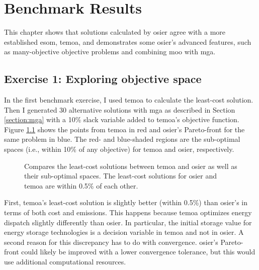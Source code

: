 \chapter{Benchmark Results}
\label{chapter:benchmark-results}

This chapter shows that solutions calculated by \ac{osier} 
agree with a more established \ac{esom}, \ac{temoa}, and demonstrates
some \ac{osier}'s advanced features, such as many-objective objective problems and combining \ac{moo} with \ac{mga}.

\section{Exercise 1: Exploring objective space}
In the first benchmark exercise, I used \ac{temoa} to calculate
the least-cost solution. Then I generated 30 alternative solutions
with \ac{mga} as described in Section \ref{section:mga} with a 10\% slack variable added to \ac{temoa}'s objective function. Figure
\ref{fig:temoa-benchmark-01} shows the points from \ac{temoa} in red
and \ac{osier}'s Pareto-front for the same problem in blue. The red- and blue-shaded
regions are the sub-optimal spaces (i.e., within 10\% of any objective) for \ac{temoa} and \ac{osier}, respectively.

\begin{figure}[h]
  \centering
  \resizebox{0.6\columnwidth}{!}{}
  \caption{Compares the least-cost solutions between \acs{temoa}
  and \acs{osier} as well as their sub-optimal spaces. The least-cost
  solutions for \ac{osier} and \ac{temoa} are within 0.5\% of each other.}
  \label{fig:temoa-benchmark-01}
\end{figure}

First, \ac{temoa}'s least-cost solution is slightly better (within 0.5\%) than \ac{osier}'s in terms of both cost and emissions. This happens because \ac{temoa} optimizes energy dispatch slightly differently than \ac{osier}. In particular, the initial storage value
for energy storage technologies is a decision variable in \ac{temoa} and not in \ac{osier}. A second reason for this discrepancy has to do with convergence. \ac{osier}'s Pareto-front could likely be improved
with a lower convergence tolerance, but this would use additional
computational resources.

